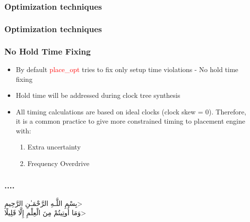 \documentclass[compress]{beamer}
\begin{document}
\begin{frame}
	\frametitle{Optimization techniques}
	\begin{center}
	\end{center}
\end{frame}
\begin{frame}
	\frametitle{Optimization techniques}
	\begin{center}
	\end{center}
\end{frame}
\begin{frame}
	\frametitle{No Hold Time Fixing}
	\begin{itemize}
		\item By default \textcolor{red}{place\_opt} tries to fix only setup time
		violations - No hold time fixing
		\item Hold time will be addressed during clock tree
		synthesis
		\item All timing calculations are based on ideal clocks (clock skew = 0). Therefore,
		it is a common practice to give more constrained timing to placement
		engine with:
		\begin{enumerate}
			\item Extra uncertainty
			\item Frequency Overdrive
		\end{enumerate}
	\end{itemize}
\end{frame}
\begin{frame}
	\frametitle{....}
	\begin{center}
		\<بِسْمِ اللَّـهِ الرَّحْمَـٰنِ الرَّحِيمِ> \\
		\<وَمَا أُوتِيتُمْ مِنَ الْعِلْمِ إِلَّا قَلِيلًا>
		
	\end{center}
\end{frame}
\end{document}
